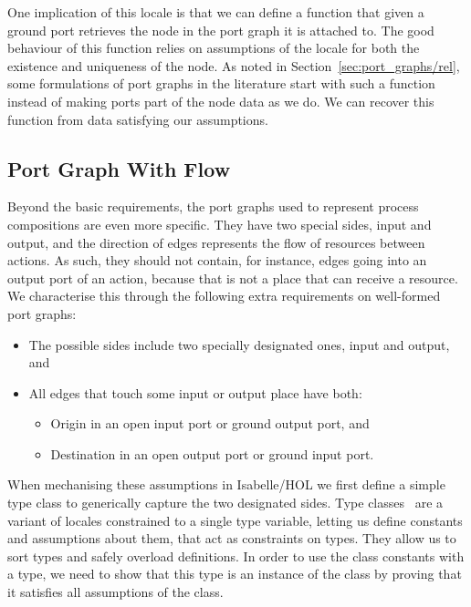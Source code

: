 \documentclass[class=smolathesis,crop=false]{standalone}
\begin{document}
One implication of this locale is that we can define a function that given a ground port retrieves the node in the port graph it is attached to.
The good behaviour of this function relies on assumptions of the locale for both the existence and uniqueness of the node.
As noted in Section~\ref{sec:port_graphs/rel}, some formulations of port graphs in the literature start with such a function instead of making ports part of the node data as we do.
We can recover this function from data satisfying our assumptions.

\subsection{Port Graph With Flow}
\label{sec:port_graphs/mech/flow_locale}

Beyond the basic requirements, the port graphs used to represent process compositions are even more specific.
They have two special sides, input and output, and the direction of edges represents the flow of resources between actions.
As such, they should not contain, for instance, edges going into an output port of an action, because that is not a place that can receive a resource.
We characterise this through the following extra requirements on well-formed port graphs:
\begin{itemize}
  \item The possible sides include two specially designated ones, input and output, and
  \item All edges that touch some input or output place have both:
    \begin{itemize}
      \item Origin in an open input port or ground output port, and
      \item Destination in an open output port or ground input port.
    \end{itemize}
\end{itemize}

When mechanising these assumptions in Isabelle/HOL we first define a simple type class to generically capture the two designated sides.
Type classes~\cite{wenzel-1997} are a variant of locales constrained to a single type variable, letting us define constants and assumptions about them, that act as constraints on types.
They allow us to sort types and safely overload definitions.
In order to use the class constants with a type, we need to show that this type is an instance of the class by proving that it satisfies all assumptions of the class.
\end{document}
